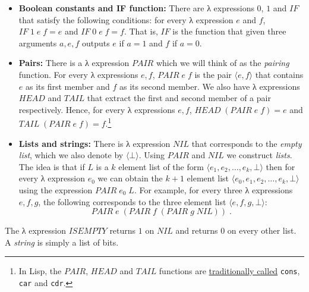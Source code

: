 \begin{itemize}
\item
  \textbf{Boolean constants and IF function:} There are λ expressions
  \(0\), \(1\) and \(\ensuremath{\mathit{IF}}\) that satisfy the
  following conditions: for every λ expression \(e\) and \(f\),
  \(\ensuremath{\mathit{IF}}\; 1\;e\;f = e\) and
  \(\ensuremath{\mathit{IF}}\;0\;e\;f = f\). That is,
  \(\ensuremath{\mathit{IF}}\) is the function that given three
  arguments \(a,e,f\) outputs \(e\) if \(a=1\) and \(f\) if \(a=0\).
\item
  \textbf{Pairs:} There is a λ expression \(\ensuremath{\mathit{PAIR}}\)
  which we will think of as the \emph{pairing} function. For every λ
  expressions \(e,f\), \(\ensuremath{\mathit{PAIR}}\; e\; f\) is the
  pair \(\langle e,f \rangle\) that contains \(e\) as its first member
  and \(f\) as its second member. We also have λ expressions
  \(\ensuremath{\mathit{HEAD}}\) and \(\ensuremath{\mathit{TAIL}}\) that
  extract the first and second member of a pair respectively. Hence, for
  every λ expressions \(e,f\),
  \(\ensuremath{\mathit{HEAD}}\; (\ensuremath{\mathit{PAIR}} \; e\; f) = e\)
  and
  \(\ensuremath{\mathit{TAIL}} \; (\ensuremath{\mathit{PAIR}} \; e\; f) = f\).\footnote{In
    Lisp, the \(\ensuremath{\mathit{PAIR}}\),
    \(\ensuremath{\mathit{HEAD}}\) and \(\ensuremath{\mathit{TAIL}}\)
    functions are \href{https://goo.gl/BLRd6S}{traditionally called}
    \texttt{cons}, \texttt{car} and \texttt{cdr}.}
\item
  \textbf{Lists and strings:} There is λ expression
  \(\ensuremath{\mathit{NIL}}\) that corresponds to the \emph{empty
  list}, which we also denote by \(\langle \bot \rangle\). Using
  \(\ensuremath{\mathit{PAIR}}\) and \(\ensuremath{\mathit{NIL}}\) we
  construct \emph{lists}. The idea is that if \(L\) is a \(k\) element
  list of the form \(\langle e_1, e_2, \ldots, e_k, \bot \rangle\) then
  for every λ expression \(e_0\) we can obtain the \(k+1\) element list
  \(\langle e_0,e_1, e_2, \ldots, e_k, \bot \rangle\) using the
  expression \(\ensuremath{\mathit{PAIR}}\; e_0 \; L\). For example, for
  every three λ expressions \(e,f,g\), the following corresponds to the
  three element list \(\langle e,f,g,\bot \rangle\): \[
  \ensuremath{\mathit{PAIR}} \; e \; \left(\ensuremath{\mathit{PAIR}}\; f \; \left( \ensuremath{\mathit{PAIR}}\; g \; \ensuremath{\mathit{NIL}} \right) \right) \;.
  \]
\end{itemize}

The λ expression \(\ensuremath{\mathit{ISEMPTY}}\) returns \(1\) on
\(\ensuremath{\mathit{NIL}}\) and returns \(0\) on every other list. A
\emph{string} is simply a list of bits.

